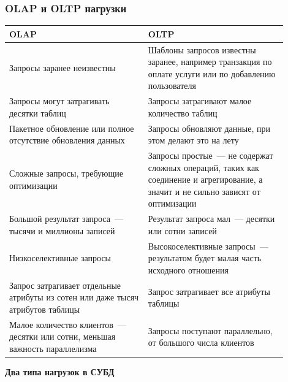 \documentclass{beamer}
\begin{document}
\begin{frame}
\frametitle{OLAP и OLTP нагрузки}

{\scriptsize

\begin{table}
\begin{center}
\begin{tabular}{|p{0.45\linewidth}|p{0.45\linewidth}|}
\hline
OLAP & OLTP \\
\hline
Запросы заранее неизвестны & Шаблоны запросов известны заранее, например транзакция по оплате услуги или по добавлению пользователя \\
\hline
Запросы могут затрагивать десятки таблиц & Запросы затрагивают малое количество таблиц \\
\hline
Пакетное обновление или полное отсутствие обновления данных & Запросы обновляют данные, при этом делают это на лету \\
\hline
Сложные запросы, требующие оптимизации & Запросы простые~--- не содержат сложных операций, таких как соединение и агрегирование, а значит и не сильно зависят от оптимизации \\
\hline
Большой результат запроса~--- тысячи и миллионы записей & Результат запроса мал~---  десятки или сотни записей \\
\hline
Низкоселективные запросы & 	Высокоселективные запросы~--- результатом будет малая часть исходного отношения \\
\hline
Запрос затрагивает отдельные атрибуты из сотен или даже тысяч атрибутов таблицы & Запрос затрагивает все атрибуты таблицы \\
\hline
Малое количество клиентов~--- десятки или сотни, меньшая важность параллелизма & Запросы поступают параллельно, от большого числа клиентов \\
\hline
\end{tabular}
\end{center}
\begin{center}\textbf{Два типа нагрузок в СУБД}\end{center}
\end{table}
}

\end{frame}
\end{document}
